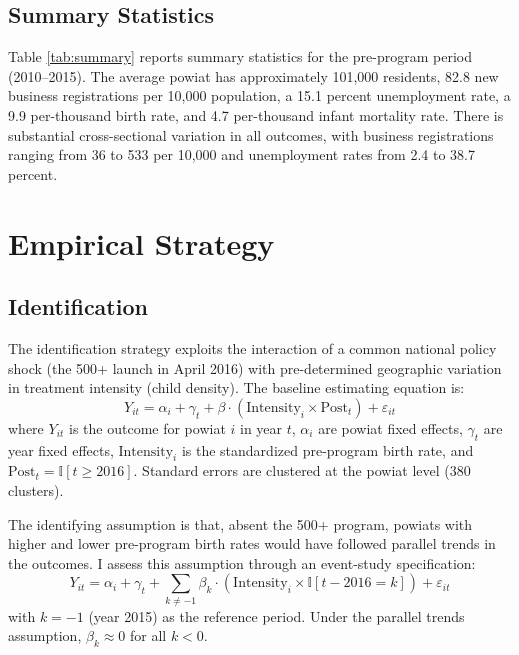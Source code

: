 \documentclass[12pt]{article}
\newcommand{\ind}{\mathbb{I}}
\begin{document}
\subsection{Summary Statistics}



Table \ref{tab:summary} reports summary statistics for the pre-program period (2010--2015). The average powiat has approximately 101,000 residents, 82.8 new business registrations per 10,000 population, a 15.1 percent unemployment rate, a 9.9 per-thousand birth rate, and 4.7 per-thousand infant mortality rate. There is substantial cross-sectional variation in all outcomes, with business registrations ranging from 36 to 533 per 10,000 and unemployment rates from 2.4 to 38.7 percent.


\section{Empirical Strategy}

\subsection{Identification}

The identification strategy exploits the interaction of a common national policy shock (the 500+ launch in April 2016) with pre-determined geographic variation in treatment intensity (child density). The baseline estimating equation is:
\begin{equation}
Y_{it} = \alpha_i + \gamma_t + \beta \cdot (\text{Intensity}_i \times \text{Post}_t) + \varepsilon_{it}
\label{eq:baseline}
\end{equation}
where $Y_{it}$ is the outcome for powiat $i$ in year $t$, $\alpha_i$ are powiat fixed effects, $\gamma_t$ are year fixed effects, $\text{Intensity}_i$ is the standardized pre-program birth rate, and $\text{Post}_t = \ind[t \geq 2016]$. Standard errors are clustered at the powiat level (380 clusters).

The identifying assumption is that, absent the 500+ program, powiats with higher and lower pre-program birth rates would have followed parallel trends in the outcomes. I assess this assumption through an event-study specification:
\begin{equation}
Y_{it} = \alpha_i + \gamma_t + \sum_{k \neq -1} \beta_k \cdot (\text{Intensity}_i \times \ind[t - 2016 = k]) + \varepsilon_{it}
\label{eq:eventstudy}
\end{equation}
with $k = -1$ (year 2015) as the reference period. Under the parallel trends assumption, $\beta_k \approx 0$ for all $k < 0$.
\end{document}
